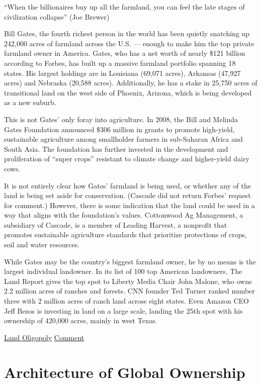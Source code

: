 \documentclass[
]{book}
\begin{document}
``When the billionaires buy up all the farmland,
you can feel the late stages of civilization collapse'' (Joe Brewer)

Bill Gates, the fourth richest person in the world has been quietly
snatching up 242,000 acres of farmland across the U.S. ---
enough to make him the top private farmland owner in America.
Gates, who has a net worth of nearly \$121 billion according to Forbes,
has built up a massive farmland portfolio spanning 18 states.
His largest holdings are in Louisiana (69,071 acres), Arkansas (47,927 acres)
and Nebraska (20,588 acres).
Additionally, he has a stake in 25,750 acres of transitional land
on the west side of Phoenix, Arizona, which is being developed as a new suburb.

This is not Gates' only foray into agriculture.
In 2008, the Bill and Melinda Gates Foundation announced
\$306 million in grants to promote high-yield, sustainable agriculture
among smallholder farmers in sub-Saharan Africa and South Asia.
The foundation has further invested in the development and
proliferation of ``super crops'' resistant to climate change
and higher-yield dairy cows.

It is not entirely clear how Gates' farmland is being used,
or whether any of the land is being set aside for conservation.
(Cascade did not return Forbes' request for comment.)
However, there is some indication that the land could be used
in a way that aligns with the foundation's values.
Cottonwood Ag Management, a subsidiary of Cascade,
is a member of Leading Harvest, a nonprofit that promotes
sustainable agriculture standards that prioritize protections
of crops, soil and water resources.

While Gates may be the country's biggest farmland owner,
he by no means is the largest individual landowner.
In its list of 100 top American landowners,
The Land Report gives the top spot to Liberty Media Chair John Malone,
who owns 2.2 million acres of ranches and forests.
CNN founder Ted Turner ranked number three with 2 million acres of ranch land
across eight states.
Even Amazon CEO Jeff Bezos is investing in land on a large scale,
landing the 25th spot with his ownership of 420,000 acres,
mainly in west Texas.

\href{https://www.forbes.com/sites/arielshapiro/2021/01/14/americas-biggest-owner-of-farmland-is-now-bill-gates-bezos-turner/}{Land Oligopoly}
\href{https://www.theguardian.com/commentisfree/2021/apr/05/bill-gates-climate-crisis-farmland}{Comment}

\hypertarget{architecture-of-global-ownership}{%
\section{Architecture of Global Ownership}\label{architecture-of-global-ownership}}
\end{document}
